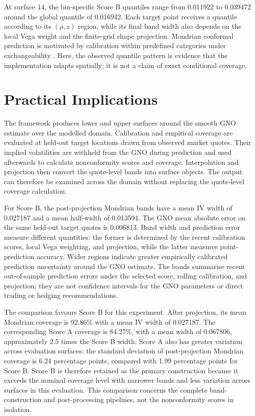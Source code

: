 At surface 14, the bin-specific Score B quantiles range from 0.011922 to 0.039472 around the global quantile of 0.016942. Each target point receives a quantile according to its $(\rho,z)$ region, while its final band width also depends on the local Vega weight and the finite-grid shape projection. Mondrian conformal prediction is motivated by calibration within predefined categories under exchangeability \cite{vovk2005algorithmic,shafer2008tutorial}. Here, the observed quantile pattern is evidence that the implementation adapts spatially; it is not a claim of exact conditional coverage.

\section{Practical Implications}
\label{sec:disc_practical}

The framework produces lower and upper surfaces around the smooth GNO estimate over the modelled domain. Calibration and empirical coverage are evaluated at held-out target locations drawn from observed market quotes. Their implied volatilities are withheld from the GNO during prediction and used afterwards to calculate nonconformity scores and coverage. Interpolation and projection then convert the quote-level bands into surface objects. The output can therefore be examined across the domain without replacing the quote-level coverage calculation.

For Score B, the post-projection Mondrian bands have a mean IV width of 0.027187 and a mean half-width of 0.013594. The GNO mean absolute error on the same held-out target quotes is 0.006813. Band width and prediction error measure different quantities: the former is determined by the recent calibration scores, local Vega weighting, and projection, while the latter measures point-prediction accuracy. Wider regions indicate greater empirically calibrated prediction uncertainty around the GNO estimate. The bands summarise recent out-of-sample prediction errors under the selected score, rolling calibration, and projection; they are not confidence intervals for the GNO parameters or direct trading or hedging recommendations.

The comparison favours Score B for this experiment. After projection, its mean Mondrian coverage is 92.86\% with a mean IV width of 0.027187. The corresponding Score A coverage is 84.27\%, with a mean width of 0.067806, approximately 2.5 times the Score B width. Score A also has greater variation across evaluation surfaces: the standard deviation of post-projection Mondrian coverage is 6.24 percentage points, compared with 1.99 percentage points for Score B. Score B is therefore retained as the primary construction because it exceeds the nominal coverage level with narrower bands and less variation across surfaces in this evaluation. This comparison concerns the complete band-construction and post-processing pipelines, not the nonconformity scores in isolation.

